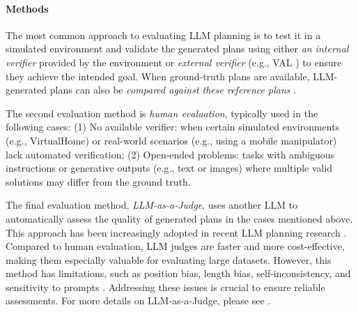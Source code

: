 \vspace{-0.08in}
\paragraph{Methods}
The most common approach to evaluating LLM planning is to test it in a simulated environment and validate the generated plans using either \emph{an internal verifier} provided by the environment or \emph{external verifier} (e.g., VAL \cite{howey2004val}) to ensure they achieve the intended goal. When ground-truth plans are available, LLM-generated plans can also be \emph{compared against these reference plans} \cite{zheng2024natural}.

The second evaluation method is \emph{human evaluation}, typically used in the following cases: (1) No available verifier: when certain simulated environments (e.g., VirtualHome) or real-world scenarios (e.g., using a mobile manipulator) lack automated verification; (2) Open-ended problems: tasks with ambiguous instructions or generative outputs (e.g., text or images) where multiple valid solutions may differ from the ground truth.

The final evaluation method, \emph{LLM-as-a-Judge}, uses another LLM to automatically assess the quality of generated plans in the cases mentioned above. This approach has been increasingly adopted in recent LLM planning research \cite{guo2024opengrounded, o2023bioplanner}. Compared to human evaluation, LLM judges are faster and more cost-effective, making them especially valuable for evaluating large datasets. However, this method has limitations, such as position bias, length bias, self-inconsistency, and sensitivity to prompts \cite{zheng2023judging, ye2024justice, wei2024systematic}. Addressing these issues is crucial to ensure reliable assessments. For more details on LLM-as-a-Judge, please see \citet{li2024generation, li2024llms, gu2024survey}.
 
\vspace{-0.05in}

